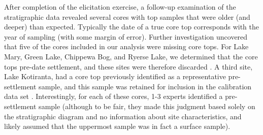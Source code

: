 \documentclass[12pt]{article}
\begin{document}
After completion of the elicitation exercise, a follow-up examination
of the stratigraphic data revealed several cores with top samples that
were older (and deeper) than expected. Typically the date of a true
core top corresponds with the year of sampling (with some margin of
error). Further investigation uncovered that five of the cores
included in our analysis were missing core tops. For Lake Mary, Green
Lake, Chippewa Bog, and Ryerse Lake, we determined that the core tops
pre-date settlement, and these sites were therefore discarded
\citep{webb1971late, lawrenz1975}. A third site, Lake Kotiranta, had a
core top previously identified as a representative pre-settlement
sample, and this sample was retained for inclusion in the calibration
data set \citep{wright1969}. Interestingly, for each of these cores,
1-3 experts identified a pre-settlement sample (although to be fair,
they made this judgment based solely on the stratigraphic diagram and
no information about site characteristics, and likely assumed that the
uppermost sample was in fact a surface sample).


\end{document}
